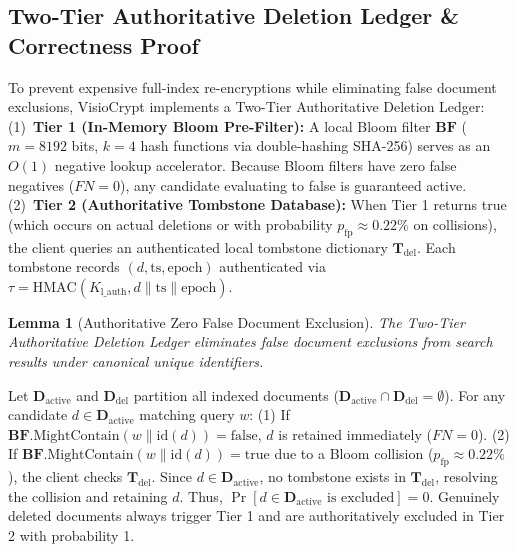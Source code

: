 \documentclass[10pt,conference]{IEEEtran}
\newtheorem{lemma}{Lemma}
\begin{document}
\subsection{Two-Tier Authoritative Deletion Ledger \& Correctness Proof}
To prevent expensive full-index re-encryptions while eliminating false document exclusions, VisioCrypt implements a Two-Tier Authoritative Deletion Ledger:
(1)~\textbf{Tier 1 (In-Memory Bloom Pre-Filter):} A local Bloom filter $\mathbf{BF}$ ($m = 8192$ bits, $k = 4$ hash functions via double-hashing SHA-256) serves as an $O(1)$ negative lookup accelerator. Because Bloom filters have zero false negatives ($FN=0$), any candidate evaluating to false is guaranteed active.
(2)~\textbf{Tier 2 (Authoritative Tombstone Database):} When Tier 1 returns true (which occurs on actual deletions or with probability $p_{\text{fp}} \approx 0.22\%$ on collisions), the client queries an authenticated local tombstone dictionary $\mathbf{T}_{\text{del}}$. Each tombstone records $(d, \text{ts}, \text{epoch})$ authenticated via $\tau = \text{HMAC}(K_{\text{l\_auth}}, d \parallel \text{ts} \parallel \text{epoch})$.

\begin{lemma}[Authoritative Zero False Document Exclusion]
The Two-Tier Authoritative Deletion Ledger eliminates false document exclusions from search results under canonical unique identifiers.
\end{lemma}
\begin{IEEEproof}
Let $\mathbf{D}_{\text{active}}$ and $\mathbf{D}_{\text{del}}$ partition all indexed documents ($\mathbf{D}_{\text{active}} \cap \mathbf{D}_{\text{del}} = \emptyset$). For any candidate $d \in \mathbf{D}_{\text{active}}$ matching query $w$: (1) If $\mathbf{BF}.\text{MightContain}(w \parallel \text{id}(d)) = \text{false}$, $d$ is retained immediately ($FN=0$). (2) If $\mathbf{BF}.\text{MightContain}(w \parallel \text{id}(d)) = \text{true}$ due to a Bloom collision ($p_{\text{fp}} \approx 0.22\%$), the client checks $\mathbf{T}_{\text{del}}$. Since $d \in \mathbf{D}_{\text{active}}$, no tombstone exists in $\mathbf{T}_{\text{del}}$, resolving the collision and retaining $d$. Thus, $\Pr[d \in \mathbf{D}_{\text{active}} \text{ is excluded}] = 0$. Genuinely deleted documents always trigger Tier 1 and are authoritatively excluded in Tier 2 with probability 1.
\end{IEEEproof}
\end{document}
